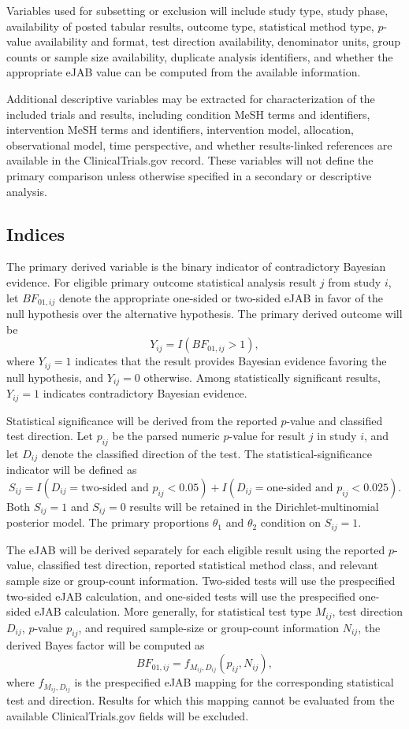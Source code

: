 \documentclass[11pt]{article}
\begin{document}
Variables used for subsetting or exclusion will include study type, study phase, availability of posted tabular results, outcome type, statistical method type, \(p\)-value availability and format, test direction availability, denominator units, group counts or sample size availability, duplicate analysis identifiers, and whether the appropriate eJAB value can be computed from the available information.

Additional descriptive variables may be extracted for characterization of the included trials and results, including condition MeSH terms and identifiers, intervention MeSH terms and identifiers, intervention model, allocation, observational model, time perspective, and whether results-linked references are available in the ClinicalTrials.gov record. These variables will not define the primary comparison unless otherwise specified in a secondary or descriptive analysis.

\subsection{Indices}

The primary derived variable is the binary indicator of contradictory Bayesian evidence. For eligible primary outcome statistical analysis result \(j\) from study \(i\), let \(BF_{01,ij}\) denote the appropriate one-sided or two-sided eJAB in favor of the null hypothesis over the alternative hypothesis. The primary derived outcome will be
\[
Y_{ij} = I(BF_{01,ij} > 1),
\]
where \(Y_{ij}=1\) indicates that the result provides Bayesian evidence favoring the null hypothesis, and \(Y_{ij}=0\) otherwise. Among statistically significant results, \(Y_{ij}=1\) indicates contradictory Bayesian evidence.

Statistical significance will be derived from the reported \(p\)-value and classified test direction. Let \(p_{ij}\) be the parsed numeric \(p\)-value for result \(j\) in study \(i\), and let \(D_{ij}\) denote the classified direction of the test. The statistical-significance indicator will be defined as
\[
S_{ij} =
I(D_{ij}=\text{two-sided and } p_{ij}<0.05)
+
I(D_{ij}=\text{one-sided and } p_{ij}<0.025).
\]
Both \(S_{ij}=1\) and \(S_{ij}=0\) results will be retained in the Dirichlet-multinomial posterior model. The primary proportions \(\theta_1\) and \(\theta_2\) condition on \(S_{ij}=1\).

The eJAB will be derived separately for each eligible result using the reported \(p\)-value, classified test direction, reported statistical method class, and relevant sample size or group-count information. Two-sided tests will use the prespecified two-sided eJAB calculation, and one-sided tests will use the prespecified one-sided eJAB calculation. More generally, for statistical test type \(M_{ij}\), test direction \(D_{ij}\), \(p\)-value \(p_{ij}\), and required sample-size or group-count information \(N_{ij}\), the derived Bayes factor will be computed as
\[
BF_{01,ij} = f_{M_{ij},D_{ij}}(p_{ij}, N_{ij}),
\]
where \(f_{M_{ij},D_{ij}}\) is the prespecified eJAB mapping for the corresponding statistical test and direction. Results for which this mapping cannot be evaluated from the available ClinicalTrials.gov fields will be excluded.
\end{document}
